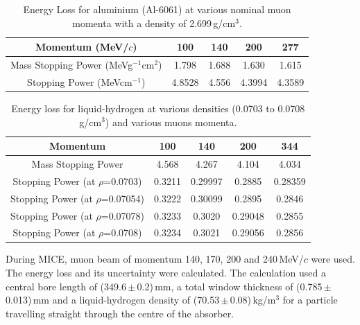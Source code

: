 \begin{table}[htb!]
  \caption{
    Energy Loss for aluminium (Al-6061) at various nominal muon momenta with a density of 2.699\,g/cm$^{3}$.
  }
  \label{tab:Aluminium}
  \begin{center}
    \begin{tabular}{|c c c c c|}
    \hline

Momentum (MeV/$c$) & 100 & 140 & 200 & 277     \rule{0pt}{14pt} \\
\hline
{Mass Stopping Power (MeVg${}^{-1}$cm${}^{2}$)} & 1.798 & 1.688 & 1.630 & 1.615
\\
{Stopping Power (MeVcm${}^{-1}$)} & 4.8528 & 4.556 & 4.3994 & 4.3589
\\

    \hline
    \end{tabular}
  \end{center}
\end{table} 

\begin{table}
  \caption{
    Energy loss for liquid-hydrogen at various densities (0.0703 to 0.0708 g/cm${}^{3}$) and various muons momenta.}
  \label{tab:Hydrogen}
  \begin{center}
    \begin{tabular}{|c c c c c|}
    \hline

Momentum & 100 & 140 & 200 & 344     \rule{0pt}{14pt} \\
\hline
{Mass Stopping Power} & 4.568 & 4.267 & 4.104 & 4.034 \\
{Stopping Power }(at $\rho$=0.0703)\textbf{} & 0.3211 & 0.29997 & 0.2885 & 0.28359\\
{Stopping Power }(at $\rho$=0.07054)\textbf{} & 0.3222 & 0.30099 & 0.2895 & 0.2846 \\
{Stopping Power }(at $\rho$=0.07078)\textbf{} & 0.3233 & 0.3020 & 0.29048 & 0.2855 \\
{Stopping Power }(at $\rho$=0.0708)\textbf{} & 0.3234 & 0.3021 & 0.29056 & 0.2856 \\
    \hline
    \end{tabular}
  \end{center}
\end{table} 


During MICE, muon beam of momentum 140, 170, 200 and 240\,MeV/$c$ were used. The energy loss and its uncertainty were calculated. The calculation used a central bore length of (349.6\,$\mathrm{\pm}$\,0.2)\,mm, a total window thickness of (0.785\,$\mathrm{\pm}$\,0.013)\,mm and a liquid-hydrogen density of (70.53\,$\mathrm{\pm}$\,0.08)\,kg/m$^{3}$ for a particle travelling straight through the centre of the absorber.

